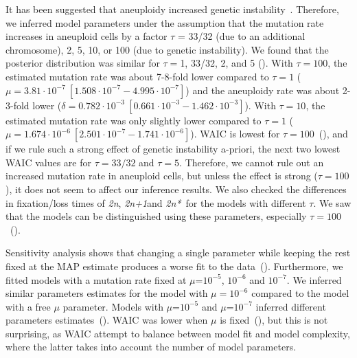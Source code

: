 \documentclass[12pt]{extarticle}
\newcommand{\euwt}{\emph{2n}}
\newcommand{\anwt}{\emph{2n+1}}
\newcommand{\eumt}{\emph{2n*}}
\begin{document}

It has been suggested that aneuploidy increased genetic instability~\citep{Sheltzer2011b}. Therefore, we inferred model parameters under the assumption that the mutation rate increases in aneuploid cells by a factor $\tau$ = 33/32 (due to an additional chromosome), 2, 5, 10, or 100 (due to genetic instability).
We found that the posterior distribution was similar for $\tau=$1, 33/32, 2, and 5 ().
With $\tau=100$, the estimated mutation rate was about 7-8-fold lower compared to $\tau=1$ ($\mu=3.81\cdot10^{-7}\ [1.508\cdot10^{-7}-4.995\cdot10^{-7}]$) and the aneuploidy rate was about 2-3-fold lower ($\delta=0.782\cdot10^{-3}\ [0.661\cdot10^{-3}-1.462\cdot10^{-3}]$). 
With $\tau=10$, the estimated mutation rate was only slightly lower compared to $\tau=1$ ($\mu=1.674\cdot10^{-6}\ [2.501\cdot10^{-7}-1.741\cdot10^{-6}]$). 
WAIC is lowest for $\tau=100$~(), and if we rule such a strong effect of genetic instability a-priori, the next two lowest WAIC values are for $\tau=33/32$ and $\tau=5$.  
Therefore, we cannot rule out an increased mutation rate in aneuploid cells, but unless the effect is strong ($\tau=100$), it does not seem to affect our inference results.
We also checked the differences in fixation/loss times of  \euwt, \anwt and \eumt\  for the models with different $\tau$. We saw that the models can be distinguished using these parameters, especially $\tau=100$~().

Sensitivity analysis shows that changing a single parameter while keeping the rest fixed at the MAP estimate produces a worse fit to the data~().
Furthermore, we fitted models with a mutation rate fixed at $\mu$=$10^{-5}$, $10^{-6}$ and $10^{-7}$. We inferred similar parameters estimates for the model with $\mu=10^{-6}$ compared to the model with a free $\mu$ parameter. Models with $\mu$=$10^{-5}$ and $\mu$=$10^{-7}$ inferred different parameters estimates~().
WAIC was lower when $\mu$ is fixed~(), but this is not surprising, as WAIC attempt to balance between model fit and model complexity, where the latter takes into account the number of model parameters. 
\end{document}
